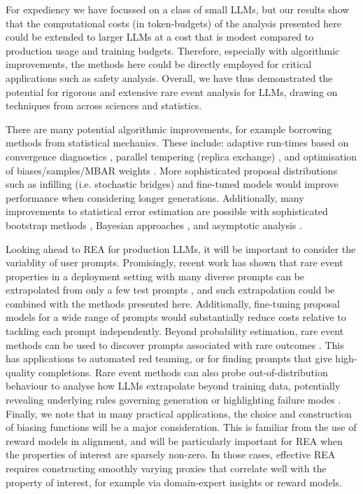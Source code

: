 \documentclass{article}
\begin{document}
For expediency we have focussed on a class of small LLMs, but our results show that the computational costs (in token-budgets) of the analysis presented here could be extended to larger LLMs at a cost that is modest compared to production usage and training budgets. Therefore, especially with algorithmic improvements, the methods here could be directly employed for critical applications such as safety analysis. Overall, we have thus demonstrated the potential for rigorous and extensive rare event analysis for LLMs, drawing on techniques from across sciences and statistics.

There are many potential algorithmic improvements, for example borrowing methods from statistical mechanics. These include: adaptive run-times based on convergence diagnostics \cite{roy2020convergence}, parallel tempering (replica exchange) \cite{earl2005parallel}, and optimisation of biases/samples/MBAR weights \cite{klimovich2015guidelines,li2023understanding}. More sophisticated proposal distributions such as infilling (i.e. stochastic bridges) \cite{bavarian2022efficient,mair2023training} and fine-tuned models \cite{rose2021a-reinforcement} would improve performance when considering longer generations. Additionally, many improvements to statistical error estimation are possible with sophisticated bootstrap methods \cite{davison1997bootstrap}, Bayesian approaches \cite{ding2024bayesian}, and asymptotic analysis \cite{li2023understanding}.

Looking ahead to REA for production LLMs, it will be important to consider the variablity of user prompts. Promisingly, recent work has shown that rare event properties in a deployment setting with many diverse prompts can be extrapolated from only a few test prompts \cite{jones2025forecasting}, and such extrapolation could be combined with the methods presented here. Additionally, fine-tuning proposal models for a wide range of prompts would substantially reduce costs relative to tackling each prompt independently. Beyond probability estimation, rare event methods can be used to discover prompts associated with rare outcomes \cite{wu2025estimating}. This has applications to automated red teaming, or for finding prompts that give high-quality completions. Rare event methods can also probe out-of-distribution behaviour to analyse how LLMs extrapolate beyond training data, potentially revealing underlying rules governing generation or highlighting failure modes \cite{yang2024generalized,lu2025out-of-distribution}. Finally, we note that in many practical applications, the choice and construction of biasing functions will be a major consideration. This is familiar from the use of reward models in alignment, and will be particularly important for REA when the properties of interest are sparsely non-zero. In those cases, effective REA requires constructing smoothly varying proxies that correlate well with the property of interest, for example via domain-expert insights or reward models.
\end{document}
